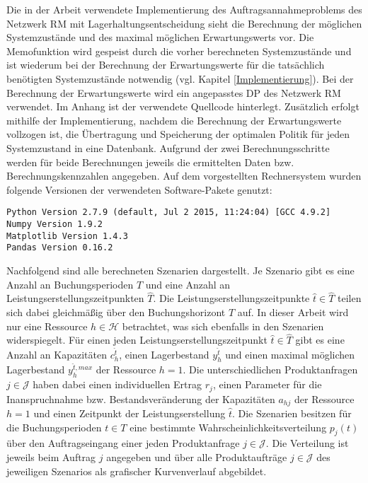 Die in der Arbeit verwendete Implementierung des Auftragsannahmeproblems des Netzwerk RM mit Lagerhaltungsentscheidung sieht die Berechnung der möglichen Systemzustände und des maximal möglichen Erwartungswerts vor. Die Memofunktion wird gespeist durch die vorher berechneten Systemzustände und ist wiederum bei der Berechnung der Erwartungswerte für die tatsächlich benötigten Systemzustände notwendig (vgl. Kapitel \ref{Implementierung}). Bei der Berechnung der Erwartungswerte wird ein angepasstes DP des Netzwerk RM verwendet. Im Anhang ist der verwendete Quellcode hinterlegt. Zusätzlich erfolgt mithilfe der Implementierung, nachdem die Berechnung der Erwartungswerte vollzogen ist, die Übertragung und Speicherung der optimalen Politik für jeden Systemzustand in eine Datenbank. Aufgrund der zwei Berechnungsschritte werden für beide Berechnungen jeweils die ermittelten Daten bzw. Berechnungskennzahlen angegeben. Auf dem vorgestellten Rechnersystem wurden folgende Versionen der verwendeten Software-Pakete genutzt:

\colorbox{hellgrau}{\parbox{14cm}{\texttt{Python Version 2.7.9 (default, Jul  2 2015, 11:24:04) [GCC 4.9.2]\\
Numpy Version 1.9.2\\
Matplotlib Version 1.4.3\\
Pandas Version 0.16.2
}}}

Nachfolgend sind alle berechneten Szenarien dargestellt. Je Szenario gibt es eine Anzahl an Buchungsperioden $T$ und eine Anzahl an Leistungserstellungszeitpunkten $\hat T$. Die Leistungserstellungszeitpunkte $\hat t \in \hat T$ teilen sich dabei gleichmäßig über den Buchungshorizont $T$ auf. In dieser Arbeit wird nur eine Ressource $h\in\mathcal{H}$ betrachtet, was sich ebenfalls in den Szenarien widerspiegelt. Für einen jeden Leistungserstellungszeitpunkt $\hat t \in \hat T$ gibt es eine Anzahl an Kapazitäten $c_h^{\hat t}$, einen Lagerbestand $y_h^{\hat t}$ und einen maximal möglichen Lagerbestand $y_h^{{\hat t},max}$ der Ressource $h=1$. Die unterschiedlichen Produktanfragen $j\in\mathcal{J}$ haben dabei einen individuellen Ertrag $r_j$, einen Parameter für die Inanspruchnahme bzw. Bestandsveränderung der Kapazitäten $a_{hj}$ der Ressource $h=1$ und einen Zeitpunkt der Leistungserstellung $\hat t$. Die Szenarien besitzen für die Buchungsperioden $t\in T$ eine bestimmte Wahrscheinlichkeitsverteilung $p_j(t)$ über den Auftragseingang einer jeden Produktanfrage $j\in\mathcal{J}$. Die Verteilung ist jeweils beim Auftrag $j$ angegeben und über alle Produktaufträge $j\in\mathcal{J}$ des jeweiligen Szenarios als grafischer Kurvenverlauf abgebildet.

